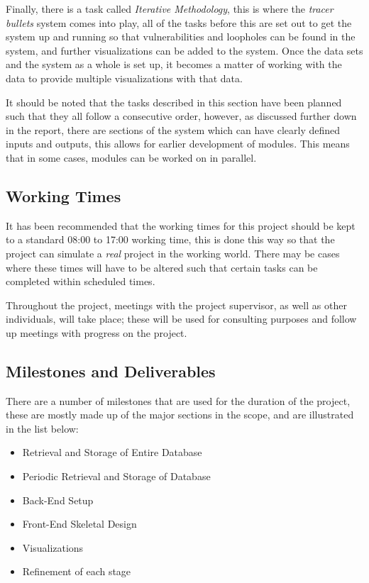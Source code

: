 \documentclass[12pt,onecolumn]{IEEEtran}
\begin{document}
Finally, there is a task called \textit{Iterative Methodology}, this is where the \textit{tracer bullets} system comes into play, all of the tasks before this are set out to get the system up and running so that vulnerabilities and loopholes can be found in the system, and further visualizations can be added to the system. Once the data sets and the system as a whole is set up, it becomes a matter of working with the data to provide multiple visualizations with that data.

It should be noted that the tasks described in this section have been planned such that they all follow a consecutive order, however, as discussed further down in the report, there are sections of the system which can have clearly defined inputs and outputs, this allows for earlier development of modules. This means that in some cases, modules can be worked on in parallel.

\subsection{Working Times} \label{sec:WorkingTimes}
It has been recommended that the working times for this project should be kept to a standard 08:00 to 17:00 working time, this is done this way so that the project can simulate a \textit{real} project in the working world.
There may be cases where these times will have to be altered such that certain tasks can be completed within scheduled times.

Throughout the project, meetings with the project supervisor, as well as other individuals, will take place; these will be used for consulting purposes and follow up meetings with progress on the project.


\subsection{Milestones and Deliverables} \label{sec:MilestonesAndDeliverables}
There are a number of milestones that are used for the duration of the project, these are mostly made up of the major sections in the scope, and are illustrated in the list below:

\begin{itemize}
    \item Retrieval and Storage of Entire Database
    \item Periodic Retrieval and Storage of Database
    \item Back-End Setup
    \item Front-End Skeletal Design
    \item Visualizations
    \item Refinement of each stage
\end{itemize}
\end{document}
